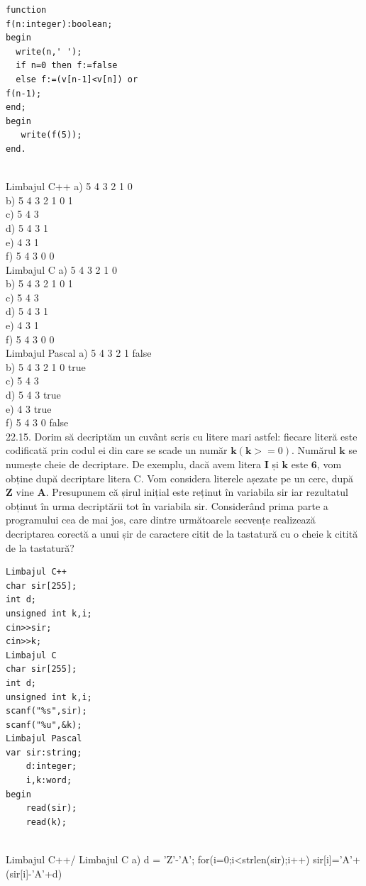 {{\begin{verbatim}
function 
f(n:integer):boolean; 
begin 
  write(n,' '); 
  if n=0 then f:=false 
  else f:=(v[n-1]<v[n]) or 
f(n-1); 
end; 
begin 
   write(f(5)); 
end.
\end{verbatim}
\\
Limbajul C++ 
a) 5 4 3 2 1 0 
\\
b) 5 4 3 2 1 0 1 
\\
c) 5 4 3 
\\
d) 5 4 3 1 
\\
e) 4 3 1 
\\
f) 5 4 3 0 0
\\
Limbajul C 
a) 5 4 3 2 1 0 
\\
b) 5 4 3 2 1 0 1 
\\
c) 5 4 3 
\\
d) 5 4 3 1 
\\
e) 4 3 1 
\\
f) 5 4 3 0 0
\\
Limbajul Pascal 
a) 5 4 3 2 1 false 
\\
b) 5 4 3 2 1 0 true 
\\
c) 5 4 3 
\\
d) 5 4 3 true 
\\
e) 4 3 true 
\\
f) 5 4 3 0 false
\\
22.15. Dorim să decriptăm un cuvânt scris cu litere mari astfel: fiecare literă este codificată prin codul ei din care se scade un număr $\mathbf{k}(\mathbf{k}>=0)$. Numărul $\mathbf{k}$ se numește cheie de decriptare. De exemplu, dacă avem litera $\mathbf{I}$ și $\mathbf{k}$ este $\mathbf{6}$, vom obține după decriptare litera C. Vom considera literele așezate pe un cerc, după $\mathbf{Z}$ vine $\mathbf{A}$. Presupunem că șirul inițial este
reținut în variabila sir iar rezultatul obținut în urma decriptării tot în variabila sir. Considerând prima parte a programului cea de mai jos, care dintre următoarele secvențe realizează decriptarea corectă a unui șir de caractere citit de la tastatură cu o cheie k citită de la tastatură?
\begin{verbatim}
Limbajul C++ 
char sir[255]; 
int d; 
unsigned int k,i; 
cin>>sir; 
cin>>k;
Limbajul C    
char sir[255]; 
int d; 
unsigned int k,i; 
scanf("%s",sir); 
scanf("%u",&k);
Limbajul Pascal 
var sir:string; 
    d:integer; 
    i,k:word; 
begin 
    read(sir); 
    read(k); 
\end{verbatim}
\\
Limbajul C++/ Limbajul C 
a) d = 'Z'-'A'; 
  for(i=0;i<strlen(sir);i++) 
       sir[i]='A'+(sir[i]-'A'+d)%
}}
